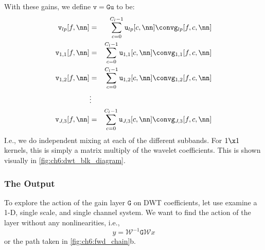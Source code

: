With these gains, we define $\mathtt{v}=\mathtt{Gu}$ to be:
\begin{eqnarray}
  \mathtt{v}_{lp}[f, \nn] &= & \sum_{c=0}^{C_l-1} \mathtt{u}_{lp}[c, \nn] \conv \mathtt{g}_{lp}[f, c, \nn] \\
  \mathtt{v}_{1,1}[f, \nn] &= & \sum_{c=0}^{C_l-1} \mathtt{u}_{1,1}[c, \nn] \conv \mathtt{g}_{1,1}[f, c, \nn] \\
  \mathtt{v}_{1,2}[f, \nn] &= & \sum_{c=0}^{C_l-1} \mathtt{u}_{1,2}[c, \nn] \conv \mathtt{g}_{1,2}[f, c, \nn] \\
                  & \vdots & \\
  \mathtt{v}_{J,3}[f, \nn] &= & \sum_{c=0}^{C_l-1} \mathtt{u}_{J,3}[c, \nn] \conv \mathtt{g}_{J,3}[f, c, \nn] 
\end{eqnarray}
%
I.e., we do independent mixing at each of the different subbands. For $1\x 1$
kernels, this is simply a matrix multiply of the wavelet coefficients. This is shown
visually in \autoref{fig:ch6:dwt_blk_diagram}.

\subsubsection{The Output}

\begin{figure}[ht!]
  \centering
  
  \label{fig:ch6:dwt_gain}
\end{figure}

To explore the action of the gain layer $\mathtt{G}$ on DWT coefficients, let
use examine a 1-D, single scale, and single channel system. We want to find the
action of the layer without any nonlinearities, i.e., 
\begin{equation}
y = \mathcal{W}^{-1}\mathtt{G}\mathcal{W}x
\end{equation}
or the path taken in \autoref{fig:ch6:fwd_chain}b. 


